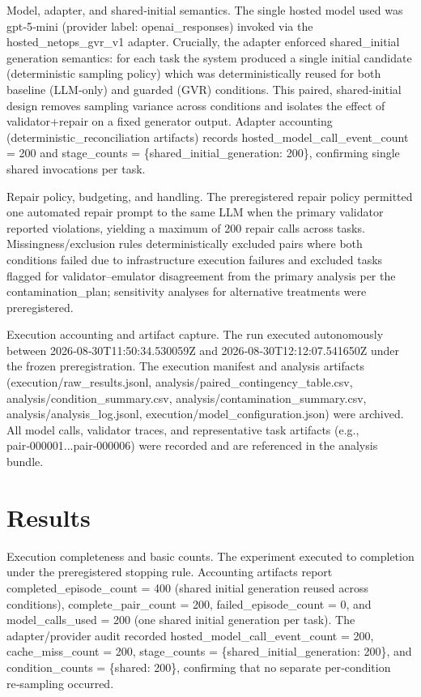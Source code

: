 \documentclass[conference]{IEEEtran}
\begin{document}
Model, adapter, and shared‑initial semantics. The single hosted model used was gpt‑5‑mini (provider label: openai\_responses) invoked via the hosted\_netops\_gvr\_v1 adapter. Crucially, the adapter enforced shared\_initial generation semantics: for each task the system produced a single initial candidate (deterministic sampling policy) which was deterministically reused for both baseline (LLM‑only) and guarded (GVR) conditions. This paired, shared‑initial design removes sampling variance across conditions and isolates the effect of validator+repair on a fixed generator output. Adapter accounting (deterministic\_reconciliation artifacts) records hosted\_model\_call\_event\_count = 200 and stage\_counts = \{shared\_initial\_generation: 200\}, confirming single shared invocations per task.

Repair policy, budgeting, and handling. The preregistered repair policy permitted one automated repair prompt to the same LLM when the primary validator reported violations, yielding a maximum of 200 repair calls across tasks. Missingness/exclusion rules deterministically excluded pairs where both conditions failed due to infrastructure execution failures and excluded tasks flagged for validator--emulator disagreement from the primary analysis per the contamination\_plan; sensitivity analyses for alternative treatments were preregistered.

Execution accounting and artifact capture. The run executed autonomously between 2026‑08‑30T11:50:34.530059Z and 2026‑08‑30T12:12:07.541650Z under the frozen preregistration. The execution manifest and analysis artifacts (execution/raw\_results.jsonl, analysis/paired\_contingency\_table.csv, analysis/condition\_summary.csv, analysis/contamination\_summary.csv, analysis/analysis\_log.jsonl, execution/model\_configuration.json) were archived. All model calls, validator traces, and representative task artifacts (e.g., pair‑000001...pair‑000006) were recorded and are referenced in the analysis bundle.

\section{Results}
Execution completeness and basic counts. The experiment executed to completion under the preregistered stopping rule. Accounting artifacts report completed\_episode\_count = 400 (shared initial generation reused across conditions), complete\_pair\_count = 200, failed\_episode\_count = 0, and model\_calls\_used = 200 (one shared initial generation per task). The adapter/provider audit recorded hosted\_model\_call\_event\_count = 200, cache\_miss\_count = 200, stage\_counts = \{shared\_initial\_generation: 200\}, and condition\_counts = \{shared: 200\}, confirming that no separate per‑condition re‑sampling occurred.
\end{document}
